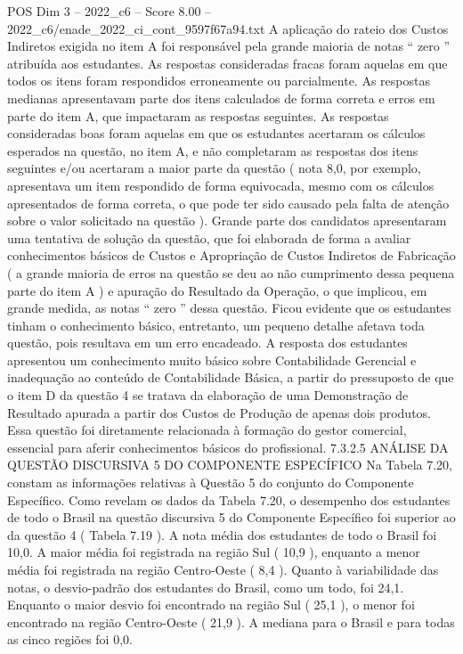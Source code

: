 \begin{textsample}{POS Dim 3 – 2022\_c6 – Score 8.00 – 2022\_c6/enade\_2022\_ci\_cont\_9597f67a94.txt}
A aplicação do rateio dos Custos Indiretos exigida no item A foi responsável pela grande maioria de notas “ zero ” atribuída aos estudantes.
As respostas consideradas fracas foram aquelas em que todos os itens foram respondidos erroneamente ou parcialmente.
As respostas medianas apresentavam parte dos itens calculados de forma correta e erros em parte do item A, que impactaram as respostas seguintes.
As respostas consideradas boas foram aquelas em que os estudantes acertaram os cálculos esperados na questão, no item A, e não completaram as respostas dos itens seguintes e/ou acertaram a maior parte da questão ( nota 8,0, por exemplo, apresentava um item respondido de forma equivocada, mesmo com os cálculos apresentados de forma correta, o que pode ter sido causado pela falta de atenção sobre o valor solicitado na questão ).
Grande parte dos candidatos apresentaram uma tentativa de solução da questão, que foi elaborada de forma a avaliar conhecimentos básicos de Custos e Apropriação de Custos Indiretos de Fabricação ( a grande maioria de erros na questão se deu ao não cumprimento dessa pequena parte do item A ) e apuração do Resultado da Operação, o que implicou, em grande medida, as notas “ zero ” dessa questão.
Ficou evidente que os estudantes tinham o conhecimento básico, entretanto, um pequeno detalhe afetava toda questão, pois resultava em um erro encadeado.
A resposta dos estudantes apresentou um conhecimento muito básico sobre Contabilidade Gerencial e inadequação ao conteúdo de Contabilidade Básica, a partir do pressuposto de que o item D da questão 4 se tratava da elaboração de uma Demonstração de Resultado apurada a partir dos Custos de Produção de apenas dois produtos.
Essa questão foi diretamente relacionada à formação do gestor comercial, essencial para aferir conhecimentos básicos do profissional. 7.3.2.5 ANÁLISE DA QUESTÃO DISCURSIVA 5 DO COMPONENTE ESPECÍFICO Na Tabela 7.20, constam as informações relativas à Questão 5 do conjunto do Componente Específico.
Como revelam os dados da Tabela 7.20, o desempenho dos estudantes de todo o Brasil na questão discursiva 5 do Componente Específico foi superior ao da questão 4 ( Tabela 7.19 ).
A nota média dos estudantes de todo o Brasil foi 10,0.
A maior média foi registrada na região Sul ( 10,9 ), enquanto a menor média foi registrada na região Centro-Oeste ( 8,4 ).
Quanto à variabilidade das notas, o desvio-padrão dos estudantes do Brasil, como um todo, foi 24,1.
Enquanto o maior desvio foi encontrado na região Sul ( 25,1 ), o menor foi encontrado na região Centro-Oeste ( 21,9 ).
A mediana para o Brasil e para todas as cinco regiões foi 0,0.

\end{textsample}
